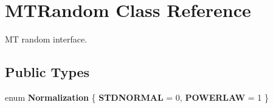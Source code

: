 \hypertarget{class_m_t_random}{\section{M\+T\+Random Class Reference}
\label{class_m_t_random}
}


M\+T random interface.  


\subsection*{Public Types}
\begin{DoxyCompactItemize}
\item 
\hypertarget{class_m_t_random_a0d2e3a1fc694095ed0cdb5fdd0cf1fb9}{enum {\bfseries Normalization} \{ {\bfseries S\+T\+D\+N\+O\+R\+M\+A\+L} = 0, 
{\bfseries P\+O\+W\+E\+R\+L\+A\+W} = 1
 \}}\label{class_m_t_random_a0d2e3a1fc694095ed0cdb5fdd0cf1fb9}

\end{DoxyCompactItemize}
